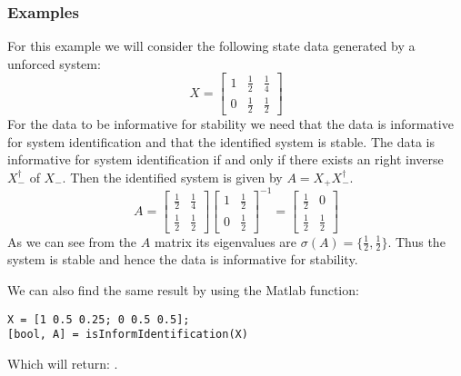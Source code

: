 \subsubsection{Examples}
For this example we will consider the following state data generated by a unforced system:
\[ X = \begin{bmatrix}
1 & \frac{1}{2} & \frac{1}{4} \\ 0 & \frac{1}{2} & \frac{1}{2}
\end{bmatrix} \]
For the data to be informative for stability we need that the data is informative for system identification and that the identified system is stable. The data is informative for system identification if and only if there exists an right inverse $X_-^\dagger$ of $X_-$. Then the identified system is given by $A = X_+ X_-^\dagger$.
\[ A = \begin{bmatrix}
\frac{1}{2} & \frac{1}{4} \\ \frac{1}{2} & \frac{1}{2}
\end{bmatrix} \begin{bmatrix}
1 & \frac{1}{2} \\ 0 & \frac{1}{2}
\end{bmatrix}^{-1} = \begin{bmatrix} \frac{1}{2} & 0 \\ \frac{1}{2} & \frac{1}{2} \end{bmatrix} \]
As we can see from the $A$ matrix its eigenvalues are $\sigma(A) = \{\frac{1}{2}, \frac{1}{2}\}$. Thus the system is stable and hence the data is informative for stability.

We can also find the same result by using the Matlab function:
\begin{lstlisting}
X = [1 0.5 0.25; 0 0.5 0.5];
[bool, A] = isInformIdentification(X)
\end{lstlisting}
Which will return: \mon{[ 1, [0.5 0 ; 0.5 0.5] ]}.